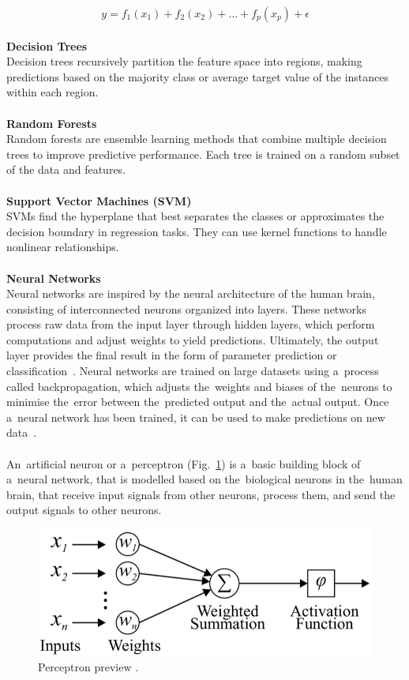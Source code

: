 \documentclass[12pt]{report}
\begin{document}
\begin{equation}
    y = f_1(x_1) + f_2(x_2) + \ldots + f_p(x_p) + \epsilon
\end{equation}
\\
\textbf{Decision Trees}\\
Decision trees recursively partition the feature space into regions, making predictions
based on the majority class or average target value of the instances within each region.\\
\\
\textbf{Random Forests}\\
Random forests are ensemble learning methods that combine multiple decision trees to improve
predictive performance. Each tree is trained on a random subset of the data and features.\\
\\
\textbf{Support Vector Machines (SVM)}\\
SVMs find the hyperplane that best separates the classes or approximates the decision boundary
in regression tasks. They can use kernel functions to handle nonlinear relationships.\\
\\
\textbf{Neural Networks}\\
Neural networks are inspired by the neural architecture of the human brain,
consisting of interconnected neurons organized
into layers. These networks process raw data from the input layer through hidden layers,
which perform computations and adjust weights to yield predictions. Ultimately, the output
layer provides the final result in the form of parameter prediction or classification~\cite{WOS:001091632800001}.
%
Neural networks are trained on large datasets using a~process called backpropagation, which
adjusts the~weights and biases of the~neurons to minimise the~error between the~predicted output
and the~actual output. Once a~neural network has been trained, it can be used to make predictions
on new data~\cite{WOS:000659928700099}.\\
\\
An~artificial neuron or a~perceptron (Fig.~\ref{fig:perceptron}) is a~basic building block
of a~neural network, that is modelled based on the~biological neurons in the~human brain,
that receive input signals from other neurons, process them, and send the output signals to
other neurons.
%
\begin{center}
    \begin{figure}[!ht]
        \centering
        \includegraphics[width=0.8\columnwidth]{nn}
        \caption{Perceptron preview \cite{WOS:000466708200028}.}
        \label{fig:perceptron}
    \end{figure}
\end{center}
\end{document}
